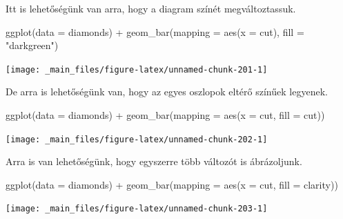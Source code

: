 \documentclass[
]{book}
\newenvironment{Shaded}{\begin{snugshade}}{\end{snugshade}}
\newcommand{\AttributeTok}[1]{\textcolor[rgb]{0.77,0.63,0.00}{#1}}
\newcommand{\FunctionTok}[1]{\textcolor[rgb]{0.00,0.00,0.00}{#1}}
\newcommand{\NormalTok}[1]{#1}
\newcommand{\SpecialCharTok}[1]{\textcolor[rgb]{0.00,0.00,0.00}{#1}}
\newcommand{\StringTok}[1]{\textcolor[rgb]{0.31,0.60,0.02}{#1}}
\begin{document}
Itt is lehetőségünk van arra, hogy a diagram színét megváltoztassuk.

\begin{Shaded}
\begin{Highlighting}[]
\FunctionTok{ggplot}\NormalTok{(}\AttributeTok{data =}\NormalTok{ diamonds) }\SpecialCharTok{+}
  \FunctionTok{geom\_bar}\NormalTok{(}\AttributeTok{mapping =} \FunctionTok{aes}\NormalTok{(}\AttributeTok{x =}\NormalTok{ cut), }\AttributeTok{fill =} \StringTok{"darkgreen"}\NormalTok{)}
\end{Highlighting}
\end{Shaded}

\begin{center}\texttt{[image: \_main\_files/figure-latex/unnamed-chunk-201-1]} \end{center}

De arra is lehetőségünk van, hogy az egyes oszlopok eltérő színűek
legyenek.

\begin{Shaded}
\begin{Highlighting}[]
\FunctionTok{ggplot}\NormalTok{(}\AttributeTok{data =}\NormalTok{ diamonds) }\SpecialCharTok{+}
  \FunctionTok{geom\_bar}\NormalTok{(}\AttributeTok{mapping =} \FunctionTok{aes}\NormalTok{(}\AttributeTok{x =}\NormalTok{ cut, }\AttributeTok{fill =}\NormalTok{ cut))}
\end{Highlighting}
\end{Shaded}

\begin{center}\texttt{[image: \_main\_files/figure-latex/unnamed-chunk-202-1]} \end{center}

Arra is van lehetőségünk, hogy egyszerre több változót is ábrázoljunk.

\begin{Shaded}
\begin{Highlighting}[]
\FunctionTok{ggplot}\NormalTok{(}\AttributeTok{data =}\NormalTok{ diamonds) }\SpecialCharTok{+}
  \FunctionTok{geom\_bar}\NormalTok{(}\AttributeTok{mapping =} \FunctionTok{aes}\NormalTok{(}\AttributeTok{x =}\NormalTok{ cut, }\AttributeTok{fill =}\NormalTok{ clarity))}
\end{Highlighting}
\end{Shaded}

\begin{center}\texttt{[image: \_main\_files/figure-latex/unnamed-chunk-203-1]} \end{center}
\end{document}
